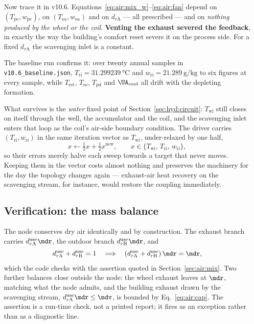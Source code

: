 Now trace it in v10.6. Equations~\eqref{eq:air:mix_w}--\eqref{eq:air:fan}
depend on $(T_{\mathrm{pc}},w_{\mathrm{pc}})$, on
$(T_{\mathrm{oa}},w_{\mathrm{oa}})$ and on $d_{r\mathrm{A}}$ --- all
prescribed --- and on \emph{nothing produced by the wheel or the coil}.
\textbf{Venting the exhaust severed the feedback}, in exactly the way the
building's comfort reset severs it on the process side. For a fixed
$d_{r\mathrm{A}}$ the scavenging inlet is a constant.

The baseline run confirms it: over twenty annual samples in
\texttt{v10.6\_baseline.json}, $T_{\mathrm{ri}}=\SI{31.299239}{\celsius}$ and
$w_{\mathrm{ri}}=\SI{21.289}{\gram\per\kilogram}$ to six figures at every
sample, while $T_{\mathrm{ret}}$, $T_{\mathrm{ro}}$, $T_{\mathrm{pd}}$ and
$\UA_{\mathrm{cool}}$ all drift with the depleting formation.

What survives is the \emph{water} fixed point of
Section~\ref{sec:hyd:circuit}: $T_{\mathrm{wi}}$ still closes on itself through
the well, the accumulator and the coil, and the scavenging inlet enters that
loop as the coil's air-side boundary condition. The driver carries
$(T_{\mathrm{ri}},w_{\mathrm{ri}})$ in the same iteration vector as
$T_{\mathrm{wi}}$, under-relaxed by one half,
\begin{equation}
x \leftarrow \tfrac12 x + \tfrac12 x^{\mathrm{new}},
\qquad
x \in \{T_{\mathrm{wi}},\,T_{\mathrm{ri}},\,w_{\mathrm{ri}}\},
\label{eq:air:relax}
\end{equation}
so their errors merely halve each sweep towards a target that never moves.
Keeping them in the vector costs almost nothing and preserves the machinery
for the day the topology changes again --- exhaust-air heat recovery on the
scavenging stream, for instance, would restore the coupling immediately.

\subsection{Verification: the mass balance}
\label{sec:air:massbal}

The node conserves dry air identically and by construction. The exhaust branch
carries $d_{r\mathrm{A}}^{\mathrm{use}}\mdr$, the outdoor branch
$d_{r\mathrm{B}}^{\mathrm{use}}\mdr$, and
\begin{equation}
d_{r\mathrm{A}}^{\mathrm{use}} + d_{r\mathrm{B}}^{\mathrm{use}} = 1
\quad\Longrightarrow\quad
\left(d_{r\mathrm{A}}^{\mathrm{use}}+d_{r\mathrm{B}}^{\mathrm{use}}\right)\mdr
= \mdr ,
\label{eq:air:massbal}
\end{equation}
which the code checks with the assertion quoted in
Section~\ref{sec:air:mix}. Two further balances close outside the node: the
wheel exhaust leaves at $\mdr$, matching what the node admits, and the
building exhaust drawn by the scavenging stream,
$d_{r\mathrm{A}}^{\mathrm{use}}\mdr \le \mdv$, is bounded by
Eq.~\eqref{eq:air:cap}. The assertion is a run-time check, not a printed
report; it fires as an exception rather than as a diagnostic line.

